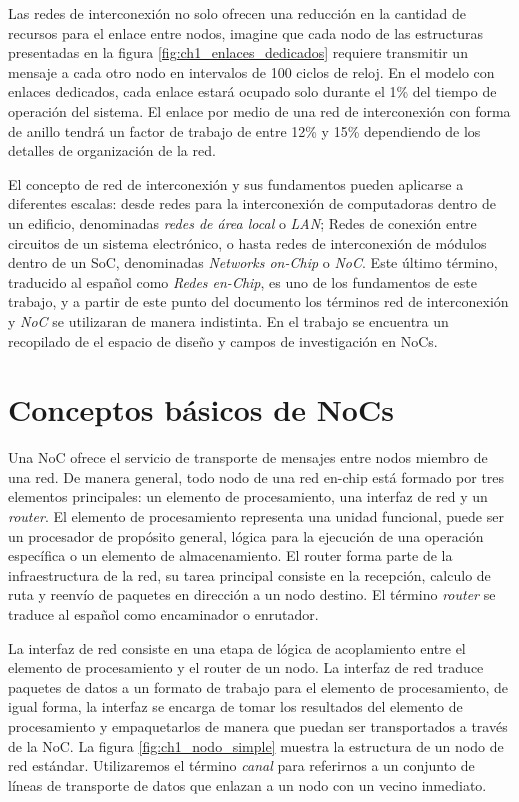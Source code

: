 Las redes de interconexión no solo ofrecen una reducción en la cantidad de recursos para el enlace entre nodos, imagine que cada nodo de las estructuras presentadas en la figura \ref{fig:ch1_enlaces_dedicados} requiere transmitir un mensaje a cada otro nodo en intervalos de 100 ciclos de reloj. En el modelo con enlaces dedicados, cada enlace estará ocupado solo durante el 1\% del tiempo de operación del sistema. El enlace por medio de una red de interconexión con forma de anillo tendrá un factor de trabajo de entre 12\% y 15\% dependiendo de los detalles de organización de la red.

El concepto de red de interconexión y sus fundamentos pueden aplicarse a diferentes escalas: desde redes para la interconexión de computadoras dentro de un edificio, denominadas \textit{redes de área local} o \textit{LAN}; Redes de conexión entre circuitos de un sistema electrónico, o hasta redes de interconexión de módulos dentro de un SoC, denominadas \textit{Networks on-Chip} o \textit{NoC}. Este último término, traducido al español como \textit{Redes en-Chip}, es uno de los fundamentos de este trabajo, y a partir de este punto del documento los términos red de interconexión y \textit{NoC} se utilizaran de manera indistinta. En el trabajo\cite{chapter1:Bjerregaard:2006:SRP:1132952.1132953} se encuentra un recopilado de el espacio de diseño y campos de investigación en NoCs.





\section{Conceptos básicos de NoCs}\label{sec:conceptos_basicos_de_nocs}

Una NoC ofrece el servicio de transporte de mensajes entre nodos miembro de una red. De manera general, todo nodo de una red en-chip está formado por tres elementos principales: un elemento de procesamiento, una interfaz de red y un \textit{router}. El elemento de procesamiento representa una unidad funcional, puede ser un procesador de propósito general, lógica para la ejecución de una operación específica o un elemento de almacenamiento. El router forma parte de la infraestructura de la red, su tarea principal consiste en la recepción, calculo de ruta y reenvío de paquetes en dirección a un nodo destino. El término \textit{router} se traduce al español como encaminador o enrutador. 

La interfaz de red consiste en una etapa de lógica de acoplamiento entre el elemento de procesamiento y el router de un nodo. La interfaz de red traduce paquetes de datos a un formato de trabajo para el elemento de procesamiento, de igual forma, la interfaz se encarga de tomar los resultados del elemento de procesamiento y empaquetarlos de manera que puedan ser transportados a través de la NoC. La figura \ref{fig:ch1_nodo_simple} muestra la estructura de un nodo de red estándar. Utilizaremos el término \textit{canal} para referirnos a un conjunto de líneas de transporte de datos que enlazan a un nodo con un vecino inmediato.

